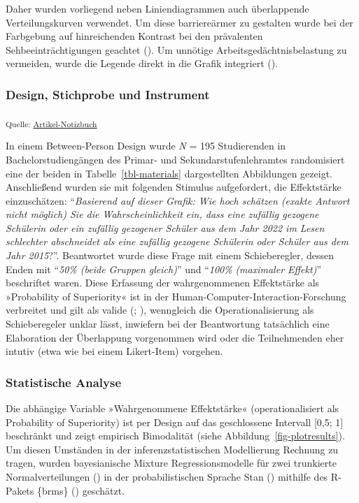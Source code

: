 \documentclass[
  man,
  floatsintext,
  longtable,
  nolmodern,
  notxfonts,
  notimes,
  colorlinks=true,linkcolor=blue,citecolor=blue,urlcolor=blue]{apa7}
\begin{document}
Daher wurden vorliegend neben Liniendiagrammen auch überlappende
Verteilungskurven verwendet. Um diese barriereärmer zu gestalten wurde
bei der Farbgebung auf hinreichenden Kontrast bei den prävalenten
Sehbeeinträchtigungen geachtet (). Um unnötige Arbeitsgedächtnisbelastung zu vermeiden, wurde
die Legende direkt in die Grafik integriert
().

\subsubsection{Design, Stichprobe und
Instrument}\label{design-stichprobe-und-instrument}

\textsubscript{Quelle:
\href{https://sammerk.github.io/StudienergebnisseBesserKommunizieren/index.qmd.html}{Artikel-Notizbuch}}

In einem Between-Person Design wurde \emph{N} = 195 Studierenden in
Bachelorstudiengängen des Primar- und Sekundarstufenlehramtes
randomisiert eine der beiden in Tabelle~\ref{tbl-materials}
dargestellten Abbildungen gezeigt. Anschließend wurden sie mit folgenden
Stimulus aufgefordert, die Effektstärke einzuschätzen: ``\emph{Basierend
auf dieser Grafik: Wie hoch schätzen (exakte Antwort nicht möglich) Sie
die Wahrscheinlichkeit ein, dass eine zufällig gezogene Schülerin oder
ein zufällig gezogener Schüler aus dem Jahr 2022 im Lesen schlechter
abschneidet als eine zufällig gezogene Schülerin oder Schüler aus dem
Jahr 2015}?''. Beantwortet wurde diese Frage mit einem Schieberegler,
dessen Enden mit ``\emph{50\% (beide Gruppen gleich)}'' und
``\emph{100\%} \emph{(maximaler Effekt)}'' beschriftet waren. Diese
Erfassung der wahrgenommenen Effektstärke als »Probability of
Superiority« ist in der Human-Computer-Interaction-Forschung verbreitet
und gilt als valide (;
), wenngleich die
Operationalisierung als Schieberegeler unklar lässt, inwiefern bei der
Beantwortung tatsächlich eine Elaboration der Überlappung vorgenommen
wird oder die Teilnehmenden eher intutiv (etwa wie bei einem
Likert-Item) vorgehen.

\subsubsection{Statistische Analyse}\label{statistische-analyse}

Die abhängige Variable »Wahrgenommene Effektstärke« (operationalisiert
als Probability of Superiority) ist per Design auf das geschlossene
Intervall {[}0,5; 1{]} beschränkt und zeigt empirisch Bimodalität (siehe
Abbildung~\ref{fig-plotresults}). Um diesen Umständen in der
inferenzstatistischen Modellierung Rechnung zu tragen, wurden
bayesianische Mixture Regressionsmodelle für zwei trunkierte
Normalverteilungen () in der probabilistischen Sprache Stan
()
mithilfe des R-Pakets \{brms\} () geschätzt.
\end{document}
